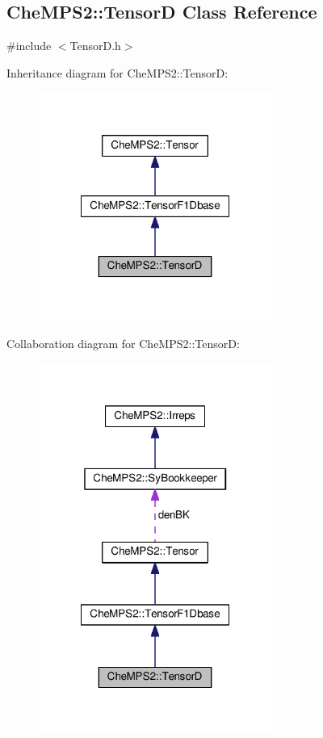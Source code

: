 \hypertarget{classCheMPS2_1_1TensorD}{\subsection{Che\-M\-P\-S2\-:\-:Tensor\-D Class Reference}
\label{classCheMPS2_1_1TensorD}
}


{\ttfamily \#include $<$Tensor\-D.\-h$>$}



Inheritance diagram for Che\-M\-P\-S2\-:\-:Tensor\-D\-:\nopagebreak
\begin{figure}[H]
\begin{center}
\leavevmode
\includegraphics[width=216pt]{classCheMPS2_1_1TensorD__inherit__graph}
\end{center}
\end{figure}


Collaboration diagram for Che\-M\-P\-S2\-:\-:Tensor\-D\-:\nopagebreak
\begin{figure}[H]
\begin{center}
\leavevmode
\includegraphics[width=216pt]{classCheMPS2_1_1TensorD__coll__graph}
\end{center}
\end{figure}
